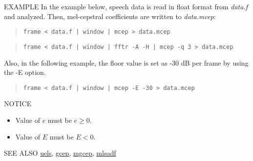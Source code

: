 \begin{options}
\end{options}

\begin{qsection}{EXAMPLE}
In the example below,
speech data is read in float format from {\em data.f} and 
analyzed. Then, mel-cepstral coefficients are written to {\em data.mcep}:
\begin{quote}
 \verb!frame < data.f | window | mcep > data.mcep !
\end{quote}
\begin{quote}
 \verb!frame < data.f | window | fftr -A -H | mcep -q 3 > data.mcep !
\end{quote}
Also, in the following example, the floor value is set as -30 dB per frame by using the -E option. 
 \begin{quote}
 \verb!frame < data.f | window | mcep -E -30 > data.mcep !
 \end{quote}

\end{qsection}

\begin{qsection}{NOTICE}
\begin{itemize}
\item Value of $e$ must be $e \geq 0$. 
\item Value of $E$ must be $E < 0$.
\end{itemize}
\end{qsection}

\begin{qsection}{SEE ALSO}
\hyperlink{uels}{uels},
\hyperlink{gcep}{gcep},
\hyperlink{mgcep}{mgcep},
\hyperlink{mlsadf}{mlsadf}
\end{qsection}
